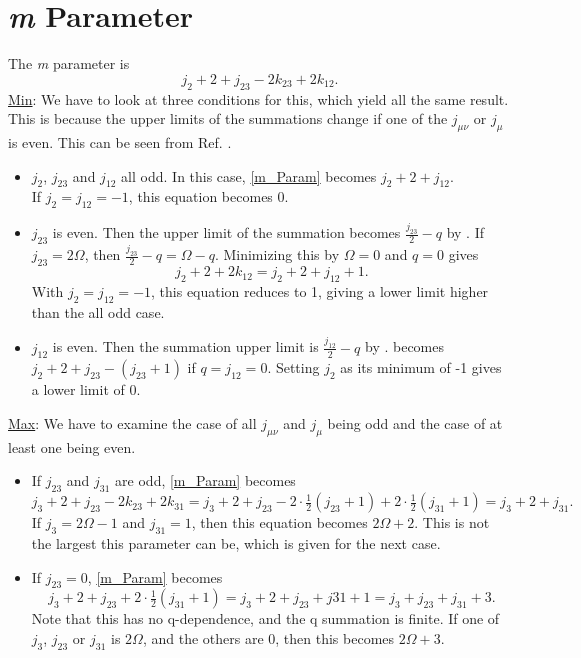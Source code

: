 \documentclass[Dissertation.tex]{subfiles}
\begin{document}
\section{\emph{m} Parameter}
The \emph{m} parameter is
\begin{equation}
	\label{m_Param}
	j_2 + 2 + j_{23} - 2 k_{23} + 2 k_{12}.
\end{equation}
\underline{Min}: 
We have to look at three conditions for this, which yield all the same result.  This is because the upper limits of the summations change if one of the $j_{\mu \nu}$ or $j_{\mu}$ is even.  This can be seen from Ref. \cite{Perkins1969}.
\begin{itemize}
	\item $j_2$, $j_{23}$ and $j_{12}$ all odd.  In this case, \cref{m_Param} becomes $j_2 + 2 + j_{12}.$ \\ If $j_2 = j_{12} = -1$, this equation becomes 0.
	\item $j_{23}$ is even.  Then the upper limit of the summation becomes $\frac{j_{23}}{2}-q$ by \cite{Perkins1969}.  If $j_{23} = 2 \Omega$, then $\frac{j_{23}}{2}-q = \Omega - q$.  Minimizing this by $\Omega = 0$ and $q = 0$ gives
\begin{equation}
	j_2 + 2 + 2 k_{12} = j_2 + 2 + j_{12} + 1.
\end{equation}
	With $j_2 = j_{12} = -1$, this equation reduces to 1, giving a lower limit higher than the all odd case.
	\item $j_{12}$ is even. Then the summation upper limit is $\frac{j_{12}}{2}-q$ by \cite{Perkins1969}.   becomes $j_2 + 2 + j_{23} - (j_{23}+1)$ if $q = j_{12} = 0$.  Setting $j_2$ as its minimum of -1 gives a lower limit of 0.
\end{itemize}
\underline{Max}: We have to examine the case of all $j_{\mu \nu}$ and $j_{\mu}$ being odd and the case of at least one being even.
\begin{itemize}
  \item If $j_{23}$ and $j_{31}$ are odd, \cref{m_Param} becomes
\[j_3 + 2 + j_{23} - 2 k_{23} + 2 k_{31} = j_3 + 2 + j_{23} - 2\cdot\tfrac{1}{2} (j_{23} + 1) + 2\cdot\tfrac{1}{2} (j_{31} + 1) = j_{3} + 2 + j_{31}.\]
If $j_3 = 2\Omega - 1$ and $j_{31} = 1$, then this equation becomes $2\Omega + 2$.  This is not the largest this parameter can be, which is given for the next case.
  \item If $j_{23} = 0$, \cref{m_Param} becomes
  \[j_3 + 2 + j_{23} + 2\cdot\tfrac{1}{2}(j_{31}+1) = j_3 + 2 + j_{23} + j{31} + 1 = j_3 + j_{23} + j_{31} + 3.\]  Note that this has no q-dependence, and the q summation is finite.  If one of $j_3$, $j_{23}$ or $j_{31}$ is $2\Omega$, and the others are 0, then this becomes $2\Omega + 3$.
\end{itemize}
\end{document}
